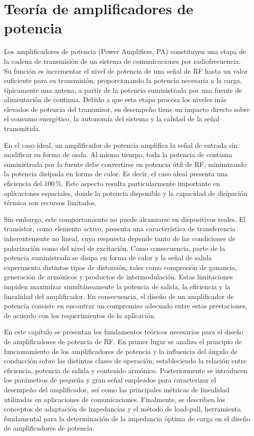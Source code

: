 \chapter[Teoría de amplificadores de potencia]{Teoría de amplificadores de potencia} \label{sec:teoria_pa}
Los amplificadores de potencia (Power Amplifiers, PA) constituyen una etapa de la cadena de transmisión de un sistema de comunicaciones por radiofrecuencia. Su función es incrementar el nivel de potencia de una señal de RF hasta un valor suficiente para su transmisión, proporcionando la potencia necesaria a la carga, típicamente una antena, a partir de la potencia suministrada por una fuente de alimentación de continua. Debido a que esta etapa procesa los niveles más elevados de potencia del transmisor, su desempeño tiene un impacto directo sobre el consumo energético, la autonomía del sistema y la calidad de la señal transmitida.

En el caso ideal, un amplificador de potencia amplifica la señal de entrada sin modificar su forma de onda. Al mismo tiempo, toda la potencia de continua suministrada por la fuente debe convertirse en potencia útil de RF, minimizando la potencia disipada en forma de calor. Es decir, el caso ideal presenta una eficiencia del 100\,\%. Este aspecto resulta particularmente importante en aplicaciones espaciales, donde la potencia disponible y la capacidad de disipación térmica son recursos limitados.

Sin embargo, este comportamiento no puede alcanzarse en dispositivos reales. El transistor, como elemento activo, presenta una característica de transferencia inherentemente no lineal, cuya respuesta depende tanto de las condiciones de polarización como del nivel de excitación. Como consecuencia, parte de la potencia suministrada se disipa en forma de calor y la señal de salida experimenta distintos tipos de distorsión, tales como compresión de ganancia, generación de armónicos y productos de intermodulación. Estas limitaciones impiden maximizar simultáneamente la potencia de salida, la eficiencia y la linealidad del amplificador. En consecuencia, el diseño de un amplificador de potencia consiste en encontrar un compromiso adecuado entre estas prestaciones, de acuerdo con los requerimientos de la aplicación.

En este capítulo se presentan los fundamentos teóricos necesarios para el diseño de amplificadores de potencia de RF. En primer lugar se analiza el principio de funcionamiento de los amplificadores de potencia y la influencia del ángulo de conducción sobre las distintas clases de operación, estableciendo la relación entre eficiencia, potencia de salida y contenido armónico. Posteriormente se introducen los parámetros de pequeña y gran señal empleados para caracterizar el desempeño del amplificador, así como las principales métricas de linealidad utilizadas en aplicaciones de comunicaciones. Finalmente, se describen los conceptos de adaptación de impedancias y el método de load-pull, herramienta fundamental para la determinación de la impedancia óptima de carga en el diseño de amplificadores de potencia.

